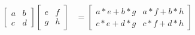 \begin{align*}
  \left[\begin{array}{rr}
    a & b \\
    c & d
  \end{array} \right]
  \left[\begin{array}{rr}
    e & f \\
    g & h
  \end{array} \right]
  & = 
  \left[\begin{array}{rr}
    a*e + b*g & a*f + b*h \\
    c*e + d*g & c*f + d*h
  \end{array} \right]
\end{align*}
